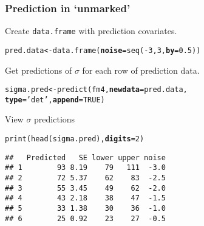 \documentclass[color=usenames,dvipsnames]{beamer}\usepackage[]{graphicx}\usepackage[]{xcolor}
\makeatletter
\newcommand{\hlnum}[1]{\textcolor[rgb]{0.69,0.494,0}{#1}}%
\newcommand{\hlstr}[1]{\textcolor[rgb]{0.749,0.012,0.012}{#1}}%
\newcommand{\hlopt}[1]{\textcolor[rgb]{0,0,0}{#1}}%
\newcommand{\hlstd}[1]{\textcolor[rgb]{0,0,0}{#1}}%
\newcommand{\hlkwb}[1]{\textcolor[rgb]{0,0.341,0.682}{#1}}%
\newcommand{\hlkwc}[1]{\textcolor[rgb]{0,0,0}{\textbf{#1}}}%
\newcommand{\hlkwd}[1]{\textcolor[rgb]{0.004,0.004,0.506}{#1}}%
\newenvironment{kframe}{%
 \def\at@end@of@kframe{}%
 \ifinner\ifhmode%
  \def\at@end@of@kframe{\end{minipage}}%
  \begin{minipage}{\columnwidth}%
 \fi\fi%
 \def\FrameCommand##1{\hskip\@totalleftmargin \hskip-\fboxsep
 \colorbox{shadecolor}{##1}\hskip-\fboxsep
     \hskip-\linewidth \hskip-\@totalleftmargin \hskip\columnwidth}%
 \MakeFramed {\advance\hsize-\width
   \@totalleftmargin\z@ \linewidth\hsize
   \@setminipage}}%
 {\par\unskip\endMakeFramed%
 \at@end@of@kframe}
\newenvironment{knitrout}{}{} %
\makeatother
\begin{document}
\begin{frame}[fragile]
  \frametitle{Prediction in `unmarked'}
  \small
  Create \texttt{data.frame} with prediction covariates. 
  \vspace{-6pt}
\begin{knitrout}\footnotesize
{}\color{fgcolor}\begin{kframe}
\begin{alltt}
\hlstd{pred.data} \hlkwb{<-} \hlkwd{data.frame}\hlstd{(}\hlkwc{noise}\hlstd{=}\hlkwd{seq}\hlstd{(}\hlopt{-}\hlnum{3}\hlstd{,} \hlnum{3}\hlstd{,} \hlkwc{by}\hlstd{=}\hlnum{0.5}\hlstd{))}
\end{alltt}
\end{kframe}
\end{knitrout}
\pause
\vfill
Get predictions of $\sigma$ for each row of prediction data.
  \vspace{-6pt}
\begin{knitrout}\footnotesize
{}\color{fgcolor}\begin{kframe}
\begin{alltt}
\hlstd{sigma.pred} \hlkwb{<-} \hlkwd{predict}\hlstd{(fm4,} \hlkwc{newdata}\hlstd{=pred.data,}
                      \hlkwc{type}\hlstd{=}\hlstr{'det'}\hlstd{,} \hlkwc{append}\hlstd{=}\hlnum{TRUE}\hlstd{)}
\end{alltt}
\end{kframe}
\end{knitrout}
\pause
\vfill
  View $\sigma$ predictions
  \vspace{-6pt}
\begin{knitrout}\footnotesize
{}\color{fgcolor}\begin{kframe}
\begin{alltt}
\hlkwd{print}\hlstd{(}\hlkwd{head}\hlstd{(sigma.pred),} \hlkwc{digits}\hlstd{=}\hlnum{2}\hlstd{)}
\end{alltt}
\begin{verbatim}
##   Predicted   SE lower upper noise
## 1        93 8.19    79   111  -3.0
## 2        72 5.37    62    83  -2.5
## 3        55 3.45    49    62  -2.0
## 4        43 2.18    38    47  -1.5
## 5        33 1.38    30    36  -1.0
## 6        25 0.92    23    27  -0.5
\end{verbatim}
\end{kframe}
\end{knitrout}
\end{frame}
\end{document}
